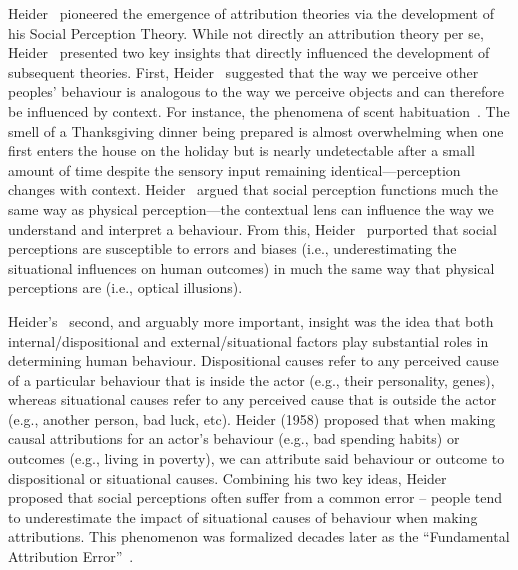 \documentclass{sfuthesis}
\begin{document}
Heider~\cite{heider58} pioneered the emergence of attribution theories via the development of his Social Perception Theory. While not directly an attribution theory per se, Heider~\cite{heider58} presented two key insights that directly influenced the development of subsequent theories. First, Heider~\cite{heider58} suggested that the way we perceive other peoples’ behaviour is analogous to the way we perceive objects and can therefore be influenced by context. For instance, the phenomena of scent habituation~\cite{pellegrino17}. The smell of a Thanksgiving dinner being prepared is almost overwhelming when one first enters the house on the holiday but is nearly undetectable after a small amount of time despite the sensory input remaining identical—perception changes with context. Heider~\cite{heider58} argued that social perception functions much the same way as physical perception—the contextual lens can influence the way we understand and interpret a behaviour. From this, Heider~\cite{heider58} purported that social perceptions are susceptible to errors and biases (i.e., underestimating the situational influences on human outcomes) in much the same way that physical perceptions are (i.e., optical illusions).

Heider’s~\cite{heider58} second, and arguably more important, insight was the idea that both internal/dispositional and external/situational factors play substantial roles in determining human behaviour. Dispositional causes refer to any perceived cause of a particular behaviour that is inside the actor (e.g., their personality, genes), whereas situational causes refer to any perceived cause that is outside the actor (e.g., another person, bad luck, etc). Heider (1958) proposed that when making causal attributions for an actor’s behaviour (e.g., bad spending habits) or outcomes (e.g., living in poverty), we can attribute said behaviour or outcome to dispositional or situational causes. Combining his two key ideas, Heider~\cite{heider58} proposed that social perceptions often suffer from a common error – people tend to underestimate the impact of situational causes of behaviour when making attributions. This phenomenon was formalized decades later as the “Fundamental Attribution Error”~\cite{ross77}.
\end{document}
